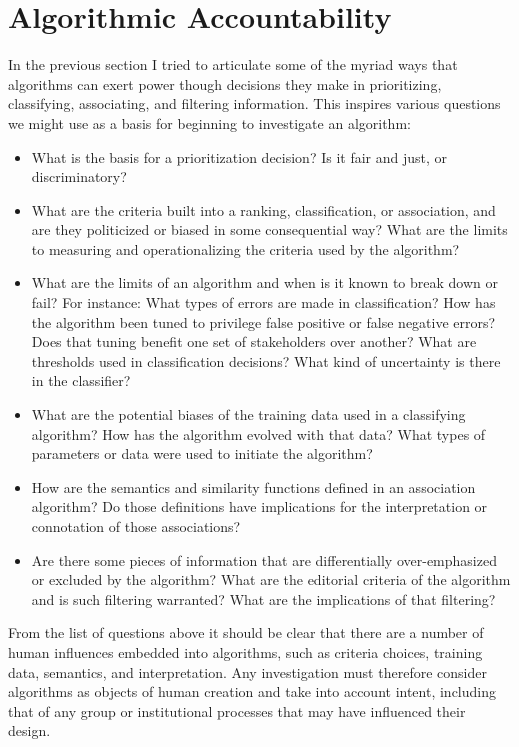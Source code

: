 \chapter{Algorithmic Accountability }
In the previous section I tried to articulate some of the myriad ways that algorithms can exert power though decisions they make in prioritizing, classifying, associating, and filtering information. This inspires various questions we might use as a basis for beginning to investigate an algorithm: 
\begin{itemize}
\item What is the basis for a prioritization decision? Is it fair and just, or discriminatory? 
\item What are the criteria built into a ranking, classification, or association, and are they politicized or biased in some consequential way? What are the limits to measuring and operationalizing the criteria used by the algorithm? 
\item What are the limits of an algorithm and when is it known to break down or fail? For instance: What types of errors are made in classification? How has the algorithm been tuned to privilege false positive or false negative errors? Does that tuning benefit one set of stakeholders over another? What are thresholds used in classification decisions? What kind of uncertainty is there in the classifier?
\item What are the potential biases of the training data used in a classifying algorithm? How has the algorithm evolved with that data? What types of parameters or data were used to initiate the algorithm? 
\item How are the semantics and similarity functions defined in an association algorithm? Do those definitions have implications for the interpretation or connotation of those associations? 
\item Are there some pieces of information that are differentially over-emphasized or excluded by the algorithm? What are the editorial criteria of the algorithm and is such filtering warranted? What are the implications of that filtering? 
\end{itemize}

From the list of questions above it should be clear that there are a number of human influences embedded into algorithms, such as criteria choices, training data, semantics, and interpretation. Any investigation must therefore consider algorithms as objects of human creation and take into account intent, including that of any group or institutional processes that may have influenced their design. 

